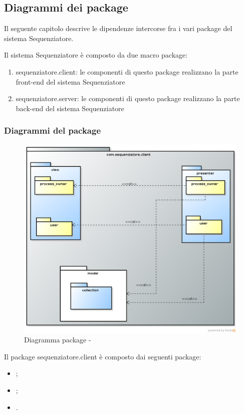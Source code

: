 \subsection{Diagrammi dei package}
Il seguente capitolo descrive le dipendenze intercorse fra i vari package del sistema Sequenziatore.

Il sistema Sequenziatore è composto da due macro package:
\begin{enumerate}
	\item sequenziatore.client: le componenti di questo package realizzano la parte front-end del sistema Sequenziatore 
	\item sequenziatore.server: le componenti di questo package realizzano la parte back-end del sistema Sequenziatore 
\end{enumerate}
\subsubsection{Diagrammi del package \client{}}

\begin{figure}[H] \centering \includegraphics[width=%
\textwidth]
{./pack/Client.png} \caption{Diagramma package - \textit{\client{}}}
\end{figure}

Il package sequenziatore.client è composto dai seguenti package:
\begin{itemize}
	\item \view{};
	\item \logic{};
	\item \model{}.
\end{itemize}

